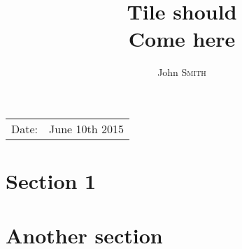 \documentclass{article}
\title{Tile should \\ Come here} %
\author{John \textsc{Smith}}
\begin{document}
\clearpage\maketitle
\thispagestyle{empty}

\begin{center}
\begin{tabular}{l r}
Date: & June 10th 2015 \\ 
\end{tabular}
\end{center}

\newpage

\tableofcontents
\newpage



\section{Section 1}
\blindtext[3]



\section{Another section}
\blindtext[2]
\end{document}

